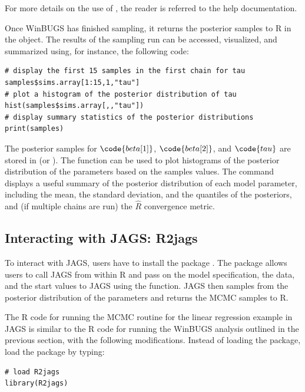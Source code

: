 \noindent For more details on the use of , the reader is referred to the help documentation. 

Once WinBUGS has finished sampling, it returns the posterior samples to R in the  object. The results of the sampling run can be accessed, visualized, and summarized using, for instance, the following code: 

\begin{lstlisting}
# display the first 15 samples in the first chain for tau
samples$sims.array[1:15,1,"tau"]
# plot a histogram of the posterior distribution of tau
hist(samples$sims.array[,,"tau"])
# display summary statistics of the posterior distributions
print(samples) 
\end{lstlisting}

\noindent The posterior samples for $\code{beta[1]}$, $\code{beta[2]}$, and $\code{tau}$ are stored in  (or ). The  function can be used to plot histograms of the posterior distribution of the parameters based on the samples values. The  command displays a useful summary of the posterior distribution of each model parameter, including the mean, the standard deviation, and the quantiles of the posteriors, and (if multiple chains are run) the $\hat{R}$ convergence metric.



\subsection{Interacting with JAGS: R2jags}

To interact with JAGS, users have to install the  package \cite{su2012r2jags}. The  package allows users to call JAGS from within R and pass on the model specification, the data, and the start values to JAGS using the  function. JAGS then samples from the posterior distribution of the parameters and returns the MCMC samples to R. 

The R code for running the MCMC routine for the linear regression example in JAGS is similar to the R code for running the WinBUGS analysis outlined in the previous section, with the following modifications. Instead of loading the  package, load the  package by typing:
\begin{lstlisting}
# load R2jags
library(R2jags)
\end{lstlisting}

